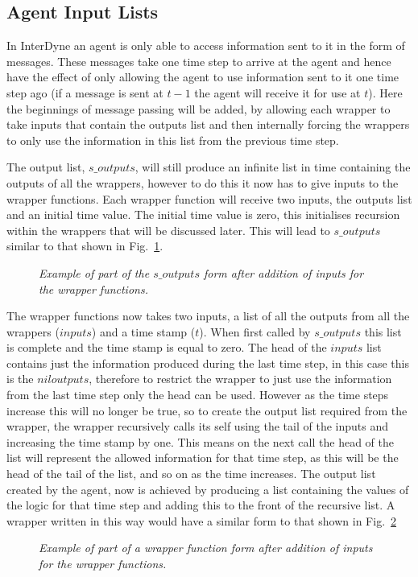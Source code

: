 \documentclass{article}
\begin{document}
\subsection{Agent Input Lists}
In InterDyne an agent is only able to access information sent to it in the form of messages. These messages take one time step to arrive at the agent and hence have the effect of only allowing the agent to use information sent to it one time step ago (if a message is sent at $t-1$ the agent will receive it for use at $t$). Here the beginnings of message passing will be added, by allowing each wrapper to take inputs that contain the outputs list and then internally forcing the wrappers to only use the information in this list from the previous time step. 

The output list, $s\_outputs$, will still produce an infinite list in time containing the outputs of all the wrappers, however to do this it now has to give inputs to the wrapper functions. Each wrapper function will receive two inputs, the outputs list and an initial time value. The initial time value is zero, this initialises recursion within the wrappers that will be discussed later.  This will lead to $s\_outputs$ similar to that shown in Fig.~\ref{fig:souts4}.
\begin{figure}[H]
	\centering
	
	\caption{\it Example of part of the $s\_outputs$ form after addition of inputs for the wrapper functions.}
	\label{fig:souts4}
\end{figure} 


The wrapper functions now takes two inputs, a list of all the outputs from all the wrappers ($inputs$) and a time stamp ($t$). When first called by $s\_outputs$ this list is complete and the time stamp is equal to zero. The head of the $inputs$ list contains just the information produced during the last time step, in this case this is the $niloutputs$, therefore to restrict the wrapper to just use the information from the last time step only the head can be used. However as the time steps increase this will no longer be true, so to create the output list required from the wrapper, the wrapper recursively calls its self using the tail of the inputs and increasing the time stamp by one. This means on the next call the head of the list will represent the allowed information for that time step, as this will be the head of the tail of the list, and so on as the time increases. The output list created by the agent, now is achieved by producing a list containing the values of the logic for that time step and adding this to the front of the recursive list. A wrapper written in this way would have a similar form to that shown in Fig.~\ref{fig:wrap4}
\begin{figure}[H]
	\centering
	
	\caption{\it Example of part of a wrapper function form after addition of inputs for the wrapper functions.  }
	\label{fig:wrap4}
\end{figure} 
\end{document}
